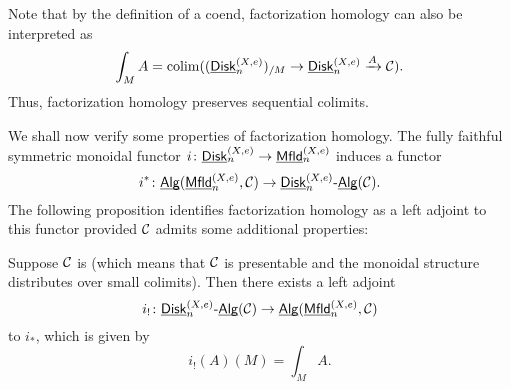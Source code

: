 \documentclass[twoside]{article}
\begin{document}
Note that by the definition of a coend, factorization homology can also be
interpreted as $$\int_MA=\mathop{\operatorname{colim}}((\underline{\smash{\mathsf{Disk}}}_n^{(X,e)})_{/M}\to\underline{\smash{\mathsf{Disk}}}_n^{(X,e)}
\xrightarrow{A}\cal C).$$ Thus, factorization homology preserves
sequential colimits.

We shall now verify some properties of factorization homology. 
The fully faithful symmetric monoidal functor $i\colon\underline{\smash{\mathsf{Disk}}}_n^{(X,e)}
\to\underline{\smash{\mathsf{Mfld}}}_n^{(X,e)}$ induces a functor $$i^*\colon\underline{\smash{\mathsf{Alg}}}(\underline{\smash{\mathsf{Mfld}}}_n^{(X,e)},\mathcal C)
\to\underline{\smash{\mathsf{Disk}}}_n^{(X,e)}\text{-}\underline{\smash{\mathsf{Alg}}}(\cal C).$$ The following proposition identifies
factorization homology as a left adjoint to this functor provided $\cal C$
admits some additional properties:

\begin{proposition}\label{r}
    Suppose $\cal C$ is  (which means that $\cal C$
    is presentable and the monoidal structure distributes over small colimits). Then
    there exists a left adjoint $$i_!\colon\underline{\smash{\mathsf{Disk}}}_n^{(X,e)}\text{-}\underline{\smash{\mathsf{Alg}}}(\mathcal C)\to
    \underline{\smash{\mathsf{Alg}}}(\underline{\smash{\mathsf{Mfld}}}_n^{(X,e)},\mathcal C)$$ to $i_*$, which is given by 
    $$i_!(A)(M)=\int_MA.$$
\end{proposition}
\end{document}
